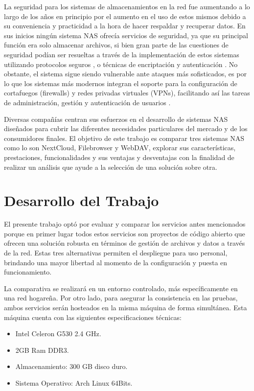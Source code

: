 \documentclass[a4paper,10pt]{article}
\begin{document}
	La seguridad para los sistemas de almacenamientos en la red fue aumentando a lo largo de los años en principio por el aumento en el uso de estos mismos debido a su conveniencia y practicidad a la hora de hacer respaldar y recuperar datos. En sus inicios ningún sistema NAS ofrecía servicios de seguridad, ya que su principal función era solo almacenar archivos, si bien gran parte de las cuestiones de seguridad podían ser resueltas a través de la implementación de estos sistemas utilizando protocolos seguros \citep{gibson1996case}, o técnicas de encriptación y autenticación \citep{miller2002strong}. No obstante, el sistema sigue siendo vulnerable ante ataques más sofisticados, es por lo que los sistemas más modernos integran el soporte para la configuración de cortafuegos (firewalls) y redes privadas virtuales (VPNs), facilitando así las tareas de administración, gestión y autenticación de usuarios \citep{Edelson_2004}.
	
	Diversas compañías centran sus esfuerzos en el desarrollo de sistemas NAS diseñados para cubrir las diferentes necesidades particulares del mercado y de los consumidores finales. El objetivo de este trabajo es comparar tres sistemas NAS como lo son NextCloud, Filebrowser y WebDAV, explorar sus características, prestaciones, funcionalidades y sus ventajas y desventajas con la finalidad de realizar un análisis que ayude a la selección de una solución sobre otra.
	
	\section{Desarrollo del Trabajo}
	El presente trabajo optó por evaluar y comparar los servicios antes mencionados porque en primer lugar todos estos servicios son proyectos de código abierto que ofrecen una solución robusta en términos de gestión de archivos y datos a través de la red. Estas tres alternativas permiten el despliegue para uso personal, brindando una mayor libertad al momento de la configuración y puesta en funcionamiento.
	
	La comparativa se realizará en un entorno controlado, más específicamente en una red hogareña. Por otro lado, para asegurar la consistencia en las pruebas, ambos servicios serán hosteados en la misma máquina de forma simultánea. Esta máquina cuenta con las siguientes especificaciones técnicas:
	
	\begin{itemize}
		\item Intel Celeron G530 2.4 GHz.
		\item 2GB Ram DDR3.
		\item Almacenamiento: 300 GB disco duro.
		\item Sistema Operativo: Arch Linux 64Bits.
	\end{itemize}
	
\end{document}
